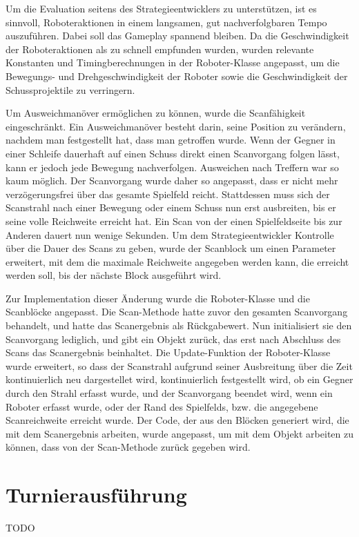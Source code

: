 Um die Evaluation seitens des Strategieentwicklers zu unterstützen, ist es sinnvoll, Roboteraktionen
in einem langsamen, gut nachverfolgbaren Tempo auszuführen. Dabei soll das Gameplay spannend
bleiben. Da die Geschwindigkeit der Roboteraktionen als zu schnell empfunden wurden, wurden
relevante Konstanten und Timingberechnungen in der Roboter-Klasse angepasst, um die Bewegungs- und
Drehgeschwindigkeit der Roboter sowie die Geschwindigkeit der Schussprojektile zu verringern.

Um Ausweichmanöver ermöglichen zu können, wurde die Scanfähigkeit eingeschränkt. Ein Ausweichmanöver
besteht darin, seine Position zu verändern, nachdem man festgestellt hat, dass man getroffen wurde.
Wenn der Gegner in einer Schleife dauerhaft auf einen Schuss direkt einen Scanvorgang folgen lässt,
kann er jedoch jede Bewegung nachverfolgen. Ausweichen nach Treffern war so kaum möglich. Der
Scanvorgang wurde daher so angepasst, dass er nicht mehr verzögerungsfrei über das gesamte
Spielfeld reicht. Stattdessen muss sich der Scanstrahl nach einer Bewegung oder einem Schuss nun
erst ausbreiten, bis er seine volle Reichweite erreicht hat. Ein Scan von der einen Spielfeldseite
bis zur Anderen dauert nun wenige Sekunden. Um dem Strategieentwickler Kontrolle über die Dauer des Scans
zu geben, wurde der Scanblock um einen Parameter erweitert, mit dem die maximale Reichweite
angegeben werden kann, die erreicht werden soll, bis der nächste Block ausgeführt wird.

Zur Implementation dieser Änderung wurde die Roboter-Klasse und die Scanblöcke angepasst. Die
Scan-Methode hatte zuvor den gesamten Scanvorgang behandelt, und hatte das Scanergebnis als
Rückgabewert. Nun initialisiert sie den Scanvorgang lediglich, und gibt ein Objekt zurück, das erst
nach Abschluss des Scans das Scanergebnis beinhaltet. Die Update-Funktion der Roboter-Klasse wurde
erweitert, so dass der Scanstrahl aufgrund seiner Ausbreitung über die Zeit kontinuierlich neu
dargestellet wird, kontinuierlich festgestellt wird, ob ein Gegner durch den Strahl erfasst wurde,
und der Scanvorgang beendet wird, wenn ein Roboter erfasst wurde, oder der Rand des Spielfelds, bzw.
die angegebene Scanreichweite erreicht wurde. Der Code, der aus den Blöcken generiert wird, die mit
dem Scanergebnis arbeiten, wurde angepasst, um mit dem Objekt arbeiten zu können, dass von der
Scan-Methode zurück gegeben wird.


\section{Turnierausführung}

TODO


